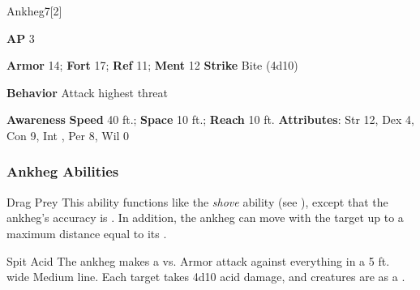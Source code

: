 \begin{monsection}{Ankheg}{7}[2]
\vspace{-1em}\vspace{-1em}
\begin{spellcontent}
\begin{spelltargetinginfo}
{\textbf{AP} 3}

\pari \textbf{Armor} 14;
\textbf{Fort} 17;
\textbf{Ref} 11;
\textbf{Ment} 12
\pari \textbf{Strike} Bite  (4d10)



\pari \textbf{Behavior} Attack highest threat
\end{spelltargetinginfo}
\end{spellcontent}

\begin{monsterfooter}
\pari \textbf{Awareness} 
\pari \textbf{Speed} 40 ft.;
\textbf{Space} 10 ft.;
\textbf{Reach} 10 ft.
\pari \textbf{Attributes}:
Str 12,
Dex 4,
Con 9,
Int ,
Per 8,
Wil 0
\end{monsterfooter}
\end{monsection}


\subsubsection{Ankheg Abilities}

\begin{freeability}{Drag Prey}
This ability functions like the \textit{shove} ability (see ), except that the ankheg's accuracy is .
In addition, the ankheg can move with the target up to a maximum distance equal to its .
\end{freeability}

\vspace{0.5em}
\begin{freeability}{Spit Acid}
The ankheg makes a  vs. Armor attack against everything in a 5 ft. wide Medium line.
\hit Each target takes 4d10 acid damage, and creatures are  as a .
\end{freeability}

